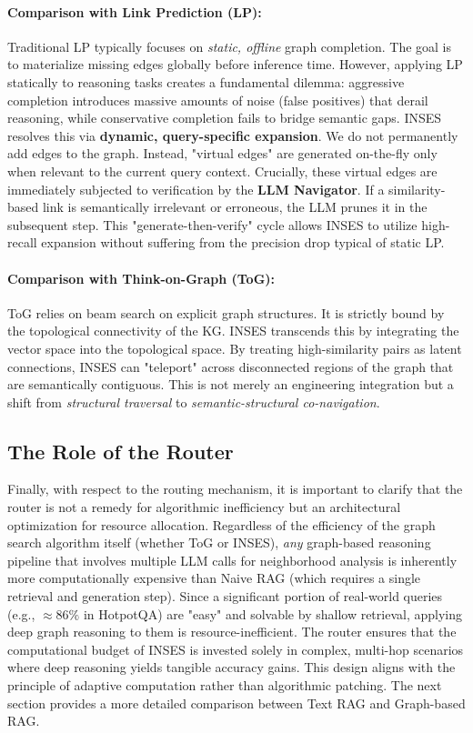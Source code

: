 \documentclass{article}
\theoremstyle{plain}
\theoremstyle{definition}
\theoremstyle{remark}
\begin{document}
\paragraph{Comparison with Link Prediction (LP):}
Traditional LP typically focuses on \textit{static, offline} graph completion. The goal is to materialize missing edges globally before inference time. However, applying LP statically to reasoning tasks creates a fundamental dilemma: aggressive completion introduces massive amounts of noise (false positives) that derail reasoning, while conservative completion fails to bridge semantic gaps. 
INSES resolves this via \textbf{dynamic, query-specific expansion}. We do not permanently add edges to the graph. Instead, "virtual edges" are generated on-the-fly only when relevant to the current query context. Crucially, these virtual edges are immediately subjected to verification by the \textbf{LLM Navigator}. If a similarity-based link is semantically irrelevant or erroneous, the LLM prunes it in the subsequent step. This "generate-then-verify" cycle allows INSES to utilize high-recall expansion without suffering from the precision drop typical of static LP.

\paragraph{Comparison with Think-on-Graph (ToG):}
ToG \citep{thinkongraph2024} relies on beam search on explicit graph structures. It is strictly bound by the topological connectivity of the KG. INSES transcends this by integrating the vector space into the topological space. By treating high-similarity pairs as latent connections, INSES can "teleport" across disconnected regions of the graph that are semantically contiguous. This is not merely an engineering integration but a shift from \textit{structural traversal} to \textit{semantic-structural co-navigation}.

\subsection{The Role of the Router}
Finally, with respect to the routing mechanism, it is important to clarify that the router is not a remedy for algorithmic inefficiency but an architectural optimization for resource allocation. 
Regardless of the efficiency of the graph search algorithm itself (whether ToG or INSES), \textit{any} graph-based reasoning pipeline that involves multiple LLM calls for neighborhood analysis is inherently more computationally expensive than Naive RAG (which requires a single retrieval and generation step). 
Since a significant portion of real-world queries (e.g., $\approx 86\%$ in HotpotQA) are "easy" and solvable by shallow retrieval, applying deep graph reasoning to them is resource-inefficient. The router ensures that the computational budget of INSES is invested solely in complex, multi-hop scenarios where deep reasoning yields tangible accuracy gains. This design aligns with the principle of adaptive computation rather than algorithmic patching. The next section provides a more detailed comparison between Text RAG and Graph-based RAG.
\end{document}
